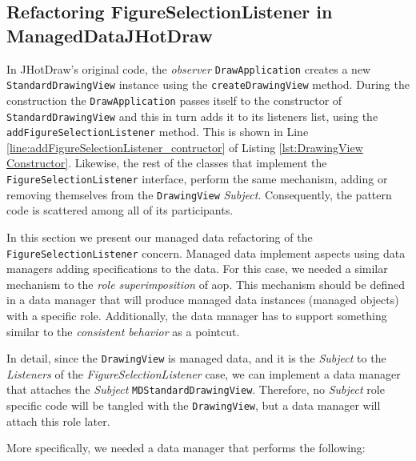 \subsection{Refactoring FigureSelectionListener in ManagedDataJHotDraw}
In JHotDraw's original code, the \textit{observer} \texttt{DrawApplication} creates a new \texttt{StandardDrawingView} instance using the \texttt{createDrawingView} method.
During the construction the \texttt{DrawApplication} passes itself to the constructor of \texttt{StandardDrawingView} and this in turn adds it to its listeners list, using the \texttt{addFigureSelectionListener} method.
This is shown in Line \ref{line:addFigureSelectionListener_contructor} of Listing \ref{lst:DrawingView Constructor}.
Likewise, the rest of the classes that implement the \texttt{FigureSelectionListener} interface, perform the same mechanism, adding or removing themselves from the \texttt{DrawingView} \textit{Subject}.
Consequently, the pattern code is scattered among all of its participants.

In this section we present our managed data refactoring of the \texttt{FigureSelectionListener} concern.
Managed data implement aspects using data managers adding specifications to the data.
For this case, we needed a similar mechanism to the \textit{role superimposition} of \ac{aop}.
This mechanism should be defined in a data manager that will produce managed data instances (managed objects) with a specific role.
Additionally, the data manager has to support something similar to the \textit{consistent behavior} as a pointcut.

In detail, since the \texttt{DrawingView} is managed data, and it is the \textit{Subject} to the \textit{Listeners} of the \textit{FigureSelectionListener} case, we can implement a data manager that attaches the \textit{Subject} \texttt{MDStandardDrawingView}.
Therefore, no \textit{Subject} role specific code will be tangled with the \texttt{DrawingView}, but a data manager will attach this role later.

More specifically, we needed a data manager that performs the following:

